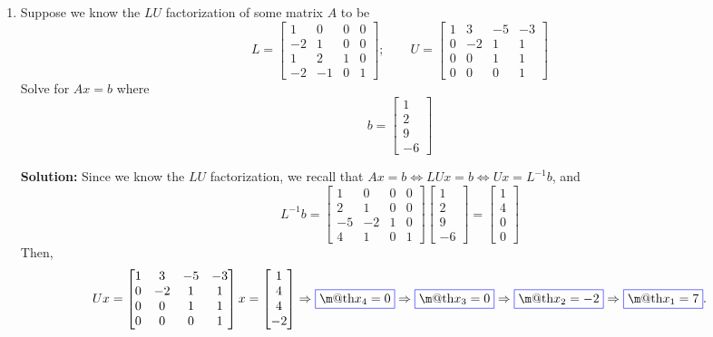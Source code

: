 \documentclass[14pt]{amsart}
\makeatletter
\newcommand{\?}{\stackrel{?}{=}}
\newcommand*{\boxedcolor}{blue}
\renewcommand{\boxed}[1]{\textcolor{\boxedcolor}{%
  \fbox{\normalcolor\m@th$\displaystyle#1$}}}
\makeatother
\begin{document}
\begin{enumerate}
\item  Suppose we know the $LU$ factorization of some matrix $A$ to be
%
\begin{equation*}
L = \begin{bmatrix}
1 & 0 & 0 & 0\\
-2 & 1 & 0 & 0\\
1 & 2 & 1 & 0\\
-2 & -1 & 0 & 1
\end{bmatrix};\qquad U = \begin{bmatrix}
1 & 3 & -5 & -3\\
0 & -2 & 1 & 1\\
0 & 0 & 1 & 1\\
0 & 0 & 0 & 1
\end{bmatrix}
\end{equation*}
%
Solve for $Ax = b$ where
%
\begin{equation*}
b = \begin{bmatrix}
1\\
2\\
9\\
-6
\end{bmatrix}
\end{equation*}

\textbf{Solution:  }  Since we know the $LU$ factorization, we recall that $Ax = b \Leftrightarrow LUx = b
\Leftrightarrow Ux = L^{-1}b$, and
%
\begin{equation*}
L^{-1}b = \begin{bmatrix}
1 & 0 & 0 & 0\\
2 & 1 & 0 & 0\\
-5 & -2 & 1 & 0\\
4 & 1 & 0 & 1
\end{bmatrix}\begin{bmatrix}
1\\
2\\
9\\
-6
\end{bmatrix} = \begin{bmatrix}
1\\
4\\
0\\
0
\end{bmatrix}
\end{equation*}
%
Then,
%
\begin{equation*}
Ux =  \begin{bmatrix}
1 & 3 & -5 & -3\\
0 & -2 & 1 & 1\\
0 & 0 & 1 & 1\\
0 & 0 & 0 & 1
\end{bmatrix}x = \begin{bmatrix}
1\\
4\\
4\\
-2
\end{bmatrix} \Rightarrow \boxed{x_4 = 0} \Rightarrow \boxed{x_3 = 0} \Rightarrow \boxed{x_2 = -2}
\Rightarrow \boxed{x_1 = 7}.
\end{equation*}


\end{enumerate}
\end{document}
